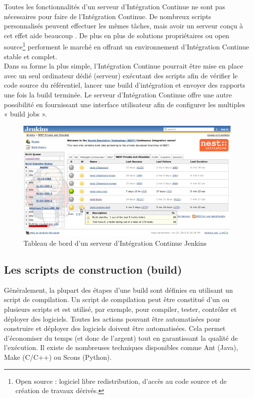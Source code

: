     Toutes les fonctionnalités d’un serveur d’Intégration Continue ne sont pas nécessaires pour faire de l’Intégration Continue. De nombreux scripts personnalisés peuvent effectuer les mêmes tâches, mais avoir un serveur conçu à cet effet aide beaucoup \cite{Duv07}. De plus en plus de solutions propriétaires ou open source\footnote{Open source : logiciel libre redistribution, d'accès au code source et de création de travaux dérivés.} performent le marché en offrant un environnement d’Intégration Continue stable et complet.\\

    Dans sa forme la plus simple, l’Intégration Continue pourrait être mise en place avec un seul ordinateur dédié (serveur) exécutant des scripts afin de vérifier le code source du référentiel, lancer une build d’intégration et envoyer des rapports une fois la build terminée. Le serveur d’Intégration Continue offre une autre possibilité en fournissant une interface utilisateur afin de configurer les multiples « build jobs ».

    \begin{figure}
      \begin{center}
        \includegraphics[scale=0.5]{images/jenkinsBuildJobs.png}
      \end{center}
      \caption{Tableau de bord d'un serveur d'Intégration Continue Jenkins}
      \label{Jenkins build jobs}
    \end{figure}

    \subsection{Les scripts de construction (build)}
    Généralement, la plupart des étapes d’une build sont définies en utilisant un script de compilation. Un script de compilation peut être constitué d'un ou plusieurs scripts et est utilisé, par exemple, pour compiler, tester, contrôler et déployer des logiciels. Toutes les actions pouvant être automatisées pour construire et déployer des logiciels doivent être automatisées. Cela permet d'économiser du temps (et donc de l'argent) tout en garantissant la qualité de l'exécution. Il existe de nombreuses techniques disponibles comme Ant (Java), Make (C/C++) ou Scons (Python).\\

